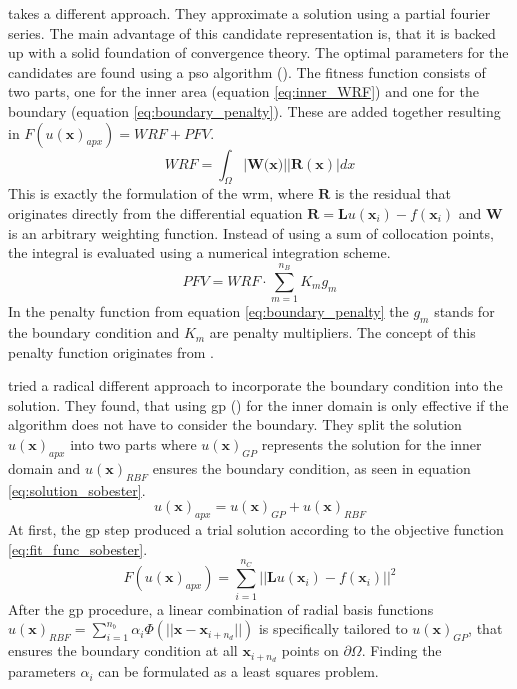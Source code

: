 \documentclass[./\jobname.tex,hidelinks]{subfiles}
\begin{document}
\cite{babaei_general_2013} takes a different approach. They approximate a solution using a partial fourier series. The main advantage of this candidate representation is, that it is backed up with a solid foundation of convergence theory. The optimal parameters for the candidates are found using a \gls{pso} algorithm (\cite{kennedy_particle_1995}). The fitness function consists of two parts, one for the inner area (equation \ref{eq:inner_WRF}) and one for the boundary (equation \ref{eq:boundary_penalty}). These are added together resulting in $F(u(\mathbf{x})_{apx}) = WRF + PFV$.
\begin{equation}
\label{eq:inner_WRF}
WRF = \int_{\Omega} |\mathbf{W}(\mathbf{x)}| |\mathbf{R}(\mathbf{x})| dx
\end{equation}
This is exactly the formulation of the \gls{wrm}, where $\mathbf{R}$ is the residual that originates directly from the differential equation $\mathbf{R} = \mathbf{L}u(\mathbf{x}_i) - f(\mathbf{x}_i)$ and $\mathbf{W}$ is an arbitrary weighting function. Instead of using a sum of collocation points, the integral is evaluated using a numerical integration scheme. 
\begin{equation}
\label{eq:boundary_penalty}
PFV = WRF \cdot \sum_{m=1}^{n_B} K_m g_m
\end{equation}
In the penalty function from equation \ref{eq:boundary_penalty} the $g_m$ stands for the boundary condition and $K_m$ are penalty multipliers. The concept of this penalty function originates from \cite{rajeev_s_discrete_1992}. 

\cite{sobester_genetic_2008} tried a radical different approach to incorporate the boundary condition into the solution. They found, that using \gls{gp} (\cite{koza_genetic_1992}) for the inner domain is only effective if the algorithm does not have to consider the boundary. They split the solution $u(\mathbf{x})_{apx}$ into two parts where $u(\mathbf{x})_{GP}$ represents the solution for the inner domain and $u(\mathbf{x})_{RBF}$ ensures the boundary condition, as seen in equation \ref{eq:solution_sobester}. 
\begin{equation}
\label{eq:solution_sobester}
u(\mathbf{x})_{apx} = u(\mathbf{x})_{GP} + u(\mathbf{x})_{RBF}
\end{equation}
At first, the \gls{gp} step produced a trial solution according to the objective function \ref{eq:fit_func_sobester}. 
\begin{equation}
\label{eq:fit_func_sobester}
F(u(\mathbf{x})_{apx}) = \sum_{i=1}^{n_C} || \mathbf{L}u(\mathbf{x}_i) - f(\mathbf{x}_i)||^2
\end{equation}
After the \gls{gp} procedure, a linear combination of radial basis functions $u(\mathbf{x})_{RBF} = \sum_{i=1}^{n_b} \alpha_i \Phi (||\mathbf{x}-\mathbf{x}_{i+n_d}||)$ is specifically tailored to $u(\mathbf{x})_{GP}$, that ensures the boundary condition at all $\mathbf{x}_{i+n_d}$ points on $\partial \Omega$. Finding the parameters $\alpha_i$ can be formulated as a least squares problem. 
\end{document}
